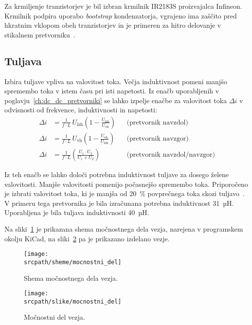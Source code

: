 \documentclass[a4paper,twoside,openright,12pt,slovene]{book}
\newcommand{\srcpath}{res_dark}
\newcommand{\srcpath}{res}
\begin{document}
Za krmiljenje tranzistorjev je bil izbran krmilnik IR2183S proizvajalca Infineon.
Krmilnik podpira uporabo \textit{bootstrap} kondenzatorja, vgrajeno ima zaščito pred hkratnim vklopom obeh tranzistorjev
in je primeren za hitro delovanje v stikalnem pretvorniku~\cite{infineon_technologies_ag_ir2183_nodate}.

\subsection{Tuljava} \label{subsec:tuljava}
Izbira tuljave vpliva na valovitost toka.
Večja induktivnost pomeni manjšo spremembo toka v istem času pri isti napetosti.
Iz enačb uporabljenih v poglavju~\ref{ch:dc_dc_pretvorniki} se lahko izpelje enačbe za valovitost toka $\Delta i$ v odvisnosti od frekvence, induktivnosti in napetosti:
\begin{align}
    \Delta i &= \frac{1}{f \cdot L} \, U_\mathrm{izh} \left( 1-\frac{U_\mathrm{izh}}{U_\mathrm{vh}} \right) && \text{(pretvornik navzdol)} \\
    \Delta i &= \frac{1}{f \cdot L} \, U_\mathrm{vh} \left( 1-\frac{U_\mathrm{vh}}{U_\mathrm{izh}} \right) && \text{(pretvornik navzgor)} \\
    \Delta i &= \frac{1}{f \cdot L} \left( \frac{U_1 \cdot U_2}{U_1+U_2} \right) && \text{(pretvornik navzdol/navzgor)}
\end{align}

Iz teh enačb se lahko določi potrebna induktivnost tuljave za dosego želene valovitosti.
Manjše valovitosti pomenijo počasnejšo spremembo toka.
Priporočeno je izbrati valovitost toka, ki je manjša od 20~\% povprečnega toka skozi tuljavo~\cite{vaucourt_choosing_2004}.
V primeru tega pretvornika je bila izračunana potrebna induktivnost 31~µH.\@
Uporabljena je bila tuljava induktivnosti 40~µH.\@

Na sliki~\ref{fig:mocnostni_del_shema} je prikazana shema močnostnega dela vezja, narejena v programskem okolju KiCad, na sliki~\ref{fig:mocnostni_del_slika} pa je prikazano izdelano vezje.
\begin{figure}[H]
    \centering
    \texttt{[image: \\srcpath/sheme/mocnostni\_del]}
    \caption{\label{fig:mocnostni_del_shema} Shema močnostnega dela vezja.}
\end{figure}
\begin{figure}[H]
    \centering
    \texttt{[image: \\srcpath/slike/mocnostni\_del]}
    \caption{\label{fig:mocnostni_del_slika} Močnostni del vezja.}
\end{figure}
\end{document}
